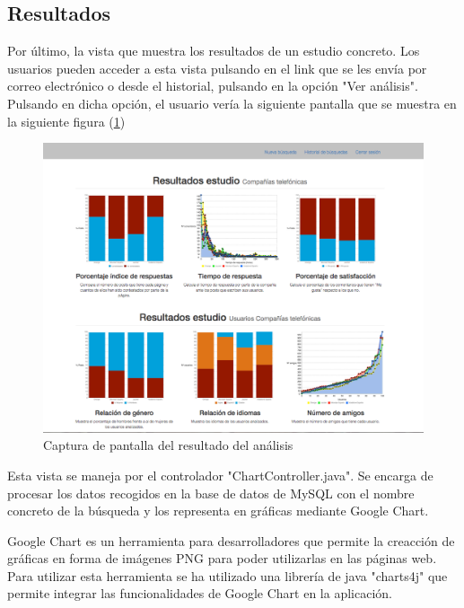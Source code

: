 \subsection{Resultados} \label{sec:4.1.5}
Por último, la vista que muestra los resultados de un estudio concreto. Los usuarios pueden acceder a esta vista pulsando en el link que se les envía por correo electrónico o desde el historial, pulsando en la opción "Ver análisis". Pulsando en dicha opción, el usuario vería la siguiente pantalla que se muestra en la siguiente figura (\ref{fig:resultados})
\begin{figure}[H]
\centering
\includegraphics[width=5in]{figuras/ejemploCompleto.png}
\caption{Captura de pantalla del resultado del análisis} \label{fig:resultados}
\end{figure}

Esta vista se maneja por el controlador "ChartController.java". Se encarga de procesar los datos recogidos en la base de datos de MySQL con el nombre concreto de la búsqueda y los representa en gráficas mediante Google Chart. 

Google Chart es un herramienta para desarrolladores que permite la creacción de gráficas en forma de imágenes PNG para poder utilizarlas en las páginas web. Para utilizar esta herramienta se ha utilizado una librería de java "charts4j" \cite{charts} que permite integrar las funcionalidades de Google Chart en la aplicación. 

